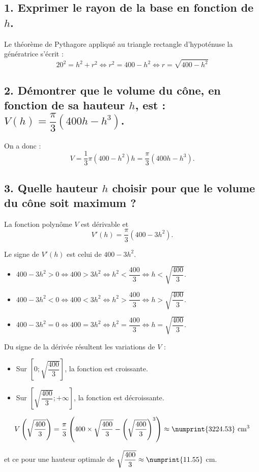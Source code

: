 \subsection*{1. Exprimer le rayon de la base en fonction de $h$.}
	
	Le théorème de Pythagore appliqué au triangle rectangle d'hypoténuse la génératrice s'écrit :
	\[
	20^2 = h^2 + r^2 \iff r^2 = 400 - h^2 \iff r = \sqrt{400 - h^2}
	\]
	
	\subsection*{2. Démontrer que le volume du cône, en fonction de sa hauteur $h$, est : $V(h) = \dfrac{\pi}{3}(400h - h^3)$.}
	
	On a donc :
	\[
	V = \dfrac{1}{3} \pi (400 - h^2)h = \dfrac{\pi}{3}(400h - h^3).
	\]
	
	\subsection*{3. Quelle hauteur $h$ choisir pour que le volume du cône soit maximum ?}
	
	La fonction polynôme $V$ est dérivable et
	\[
	V'(h) = \dfrac{\pi}{3}(400 - 3h^2).
	\]
	
	Le signe de $V'(h)$ est celui de $400 - 3h^2$.
	\begin{itemize}
		\item $400 - 3h^2 > 0 \iff 400 > 3h^2 \iff h^2 < \dfrac{400}{3} \iff h < \sqrt{\dfrac{400}{3}}$.
		\item $400 - 3h^2 < 0 \iff 400 < 3h^2 \iff h^2 > \dfrac{400}{3} \iff h > \sqrt{\dfrac{400}{3}}$.
		\item $400 - 3h^2 = 0 \iff 400 = 3h^2 \iff h^2 = \dfrac{400}{3} \iff h = \sqrt{\dfrac{400}{3}}$.
	\end{itemize}
	
	Du signe de la dérivée résultent les variations de $V$ :
	\begin{itemize}
		\item Sur $[0; \sqrt{\dfrac{400}{3}}]$, la fonction est croissante.
		\item Sur $[\sqrt{\dfrac{400}{3}}; +\infty]$, la fonction est décroissante.
	\end{itemize}
	
	\[
	V\left(\sqrt{\dfrac{400}{3}}\right) = \dfrac{\pi}{3}\left(400 \times \sqrt{\dfrac{400}{3}} - \left(\sqrt{\dfrac{400}{3}}\right)^3\right) \approx \numprint{3224.53} \text{ cm}^3
	\]
	
	et ce pour une hauteur optimale de $\sqrt{\dfrac{400}{3}} \approx \numprint{11.55}$ cm.
